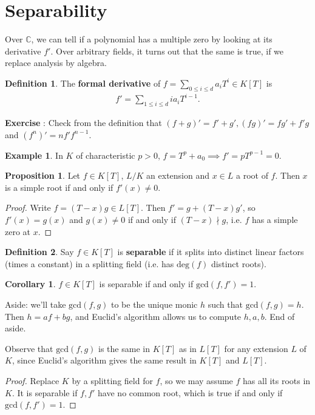 \documentclass{article}
\theoremstyle{definition}
\newtheorem{cor}[theorem]{Corollary}
\newtheorem{prop}[theorem]{Proposition}
\newtheorem{example}{Example}[section]
\newtheorem{defn}{Definition}[section]
\begin{document}
\section{Separability}
Over $\mathbb{C}$, we can tell if a polynomial has a multiple zero by looking at its derivative $f'$. Over arbitrary fields, it turns out that the same is true, if we replace analysis by algebra.
\begin{defn}
    The \textbf{formal derivative} of $f = \sum_{0\le i\le d}^{} a_iT^i \in K[T]$ is
    \begin{align*}
        f' = \sum_{1\le i \le d}^{} ia_i T^{i-1}.
    \end{align*}
\end{defn}
\textbf{Exercise} : Check from the definition that $(f+g)'=f'+g',(fg)'=fg'+f'g$ and $(f^n)'=nf'f^{n-1}$.
\begin{example}
    In $K$ of characteristic $p>0$, $f=T^p+ a_0 \implies f' = pT^{p-1}=0$.
\end{example}
\begin{prop}
    Let $f \in K[T]$, $L/K$ an extension and $x \in L$ a root of $f$. Then $x$ is a simple root if and only if $f'(x) \neq 0$.
\end{prop}
\begin{proof}
    Write $f = (T-x)g \in L[T]$. Then $f' = g + (T-x)g'$, so $f'(x)=g(x)$ and $g(x)\neq0$ if and only if $(T-x) \nmid g$, i.e. $f$ has a simple zero at $x$.
\end{proof}
\begin{defn}
    Say $f \in K[T]$ is \textbf{separable} if it splits into distinct linear factors (times a constant) in a splitting field (i.e. has $\text{deg}(f)$ distinct roots).
\end{defn}
\begin{cor}
    $f \in K[T]$ is separable if and only if $\text{gcd}(f,f')=1$.
\end{cor}
Aside: we'll take $\text{gcd}(f,g)$ to be the unique monic $h$ such that $\text{gcd}(f,g)=h$. Then $h=af+bg$, and Euclid's algorithm allows us to compute $h,a,b$. End of aside.

Observe that $\text{gcd}(f,g)$ is the same in $K[T]$ as in $L[T]$ for any extension $L$ of $K$, since Euclid's algorithm gives the same result in $K[T]$ and $L[T]$.

\begin{proof}
    Replace $K$ by a splitting field for $f$, so we may assume $f$ has all its roots in $K$. It is separable if $f, f'$ have no common root, which is true if and only if $\text{gcd}(f,f')=1$.
\end{proof}
\end{document}
